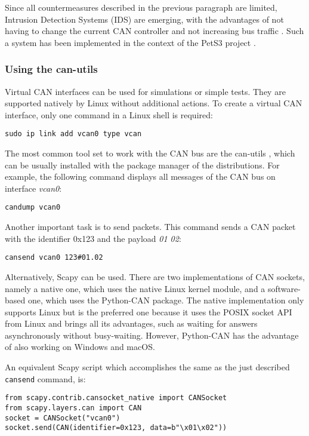 Since all countermeasures described in the previous paragraph are limited, Intrusion Detection Systems (IDS) are emerging, with the advantages of not having to change the current CAN controller and not increasing bus traffic \cite{Bozdal2020}. Such a system has been implemented in the context of the PetS3 project \cite{spahn2018}.

\subsubsection{Using the can-utils}

Virtual CAN interfaces can be used for simulations or simple tests. They are supported natively by Linux without additional actions.
To create a virtual CAN interface, only one command in a Linux shell is required:
\begin{verbatim}
sudo ip link add vcan0 type vcan
\end{verbatim}

The most common tool set to work with the CAN bus are the can-utils \cite{can-utils}, which can be usually installed with the package manager of the distributions. For example, the following command displays all messages of the CAN bus on interface \emph{vcan0}:
\begin{verbatim}
candump vcan0
\end{verbatim}

Another important task is to send packets. This command sends a CAN packet with the identifier 0x123 and the payload \emph{01 02}:
\begin{verbatim}
cansend vcan0 123#01.02
\end{verbatim}

Alternatively, Scapy can be used. There are two implementations of CAN sockets, namely a native one, which uses the native Linux kernel module, and a software-based one, which uses the Python-CAN package. The native implementation only supports Linux but is the preferred one because it uses the POSIX socket API from Linux and brings all its advantages, such as waiting for answers asynchronously without busy-waiting. However, Python-CAN has the advantage of also working on Windows and macOS.

An equivalent Scapy script which accomplishes the same as the just described \texttt{cansend} command, is:

\begin{samepage}
\begin{verbatim}
from scapy.contrib.cansocket_native import CANSocket
from scapy.layers.can import CAN
socket = CANSocket("vcan0")
socket.send(CAN(identifier=0x123, data=b"\x01\x02"))
\end{verbatim}
\end{samepage}

